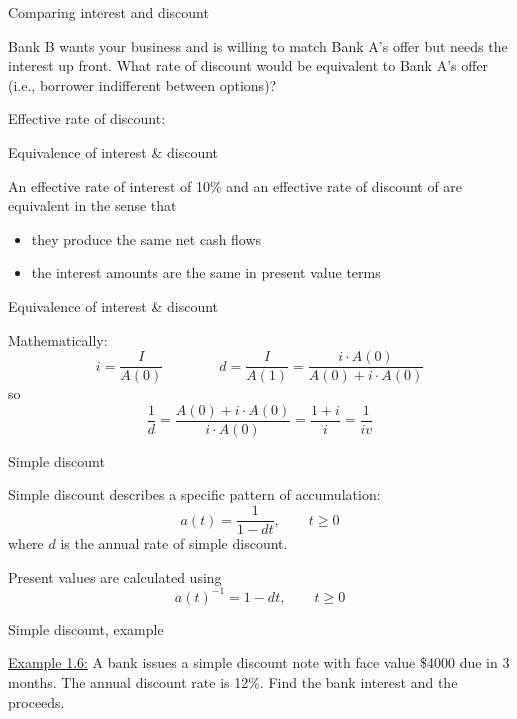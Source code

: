 \documentclass{beamer}
\begin{document}
\begin{frame}{Comparing interest and discount}

Bank B wants your business and is willing to match Bank A's offer but needs the interest up front. What rate of discount would be equivalent to Bank A's offer (i.e., borrower indifferent between options)?

\begin{center}
\cashflow{}{}{}
\end{center}

Effective rate of discount:

\vfill
\end{frame}

\begin{frame}{Equivalence of interest \& discount}

An effective rate of interest of 10\% and an effective rate of discount of  are equivalent in the sense that
\begin{itemize}
\item they produce the same net cash flows
\item the interest amounts are the same in present value terms
\end{itemize}

\begin{center}
\end{center}

\end{frame}

\begin{frame}{Equivalence of interest \& discount}

Mathematically:
\[
i = \frac{I}{A(0)} \qquad\qquad d = \frac{I}{A(1)} = \frac{i \cdot A(0)}{A(0) + i \cdot A(0)}
\]
so
\[
\frac{1}{d} = \frac{A(0) + i \cdot A(0)}{i \cdot A(0)} = \frac{1+i}{i} = \frac{1}{iv}
\]

\end{frame}

\begin{frame}{Simple discount}

Simple discount describes a specific pattern of accumulation:
\[
a(t) = \frac{1}{1 - dt}, \qquad t \ge 0
\]
where $d$ is the annual rate of simple discount.

\bigskip
Present values are calculated using
\[
a(t)^{-1} = 1 - dt, \qquad t \ge 0
\]

\end{frame}

\begin{frame}{Simple discount, example}

\underline{Example 1.6:} A bank issues a simple discount note with face value \$4000 due in 3 months. The annual discount rate is 12\%. Find the bank interest and the proceeds.

\vfill
\end{frame}
\end{document}
